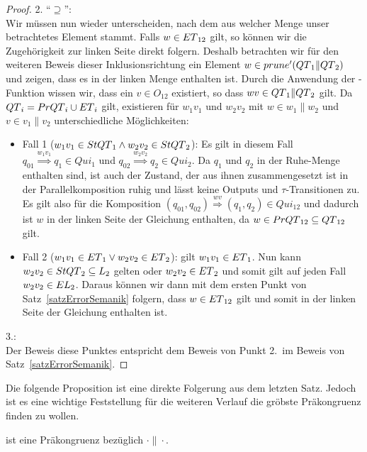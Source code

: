 \begin{proof}
  2. ``$\supseteq$'':\\
  Wir müssen nun wieder unterscheiden, nach dem aus welcher Menge unser
  betrachtetes Element stammt. Falls $w\in ET{}_{12}$ gilt, so können wir die
  Zugehörigkeit zur linken Seite direkt folgern. Deshalb betrachten wir für den
  weiteren Beweis dieser
  Inklusionsrichtung ein Element $w\in prune' (QT{}_1\|QT{}_2)$ und
  zeigen, dass es in der linken Menge enthalten ist. Durch die Anwendung der
  \prunenew{}-Funktion wissen wir, dass ein $v\in O_{12}$ existiert, so dass
  $wv\in QT{}_1\|QT{}_2$ gilt. Da $QT{}_i = PrQT{}_i\cup ET{}_i$ gilt,
  existieren für $w_1v_1$ und $w_2v_2$ mit $w\in w_1\| w_2$ und $v\in v_1\|
  v_2$ unterschiedliche Möglichkeiten:
  \begin{itemize}
    \item Fall 1 ($w_1v_1\in StQT{}_1\wedge w_2v_2\in StQT{}_2$): Es gilt in diesem
      Fall $q_{01} \overset{w_1v_1}{\Rightarrow} q_1\in Qui_1$ und $q_{02}
      \overset{w_2v_2}{\Rightarrow} q_2\in Qui_2$. Da $q_1$ und $q_2$ in der
      Ruhe-Menge enthalten sind, ist auch der Zustand, der aus ihnen
      zusammengesetzt ist in der Parallelkomposition ruhig und lässt keine
      Outputs und $\tau$-Transitionen zu. Es gilt also für die Komposition
      $(q_{01},q_{02}) \overset{wv}{\Rightarrow} (q_1,q_2)\in Qui_{12}$ und
      dadurch ist $w$ in der linken Seite der Gleichung enthalten, da $w\in
      PrQT{}_{12}\subseteq QT{}_{12}$ gilt.
    \item Fall 2 ($w_1v_1\in ET{}_1\vee w_2v_2\in ET{}_2$): \OBdA{} gilt
      $w_1v_1\in ET{}_1$. Nun kann $w_2v_2\in StQT{}_2\subseteq L_2$ gelten
      oder $w_2v_2\in ET{}_2$ und somit gilt auf jeden Fall $w_2v_2\in
      EL{}_2$. Daraus können wir dann mit dem ersten Punkt von
      Satz~\ref{satzErrorSemanik} folgern, dass $w\in ET{}_{12}$ gilt und
      somit in der linken Seite der Gleichung enthalten ist.
  \end{itemize}

  3.:\\
  Der Beweis diese Punktes entspricht dem Beweis von Punkt 2.\ im Beweis von
  Satz~\ref{satzErrorSemanik}.
\end{proof}

Die folgende Proposition ist eine direkte Folgerung aus dem letzten Satz.
Jedoch ist es eine wichtige Feststellung für die weiteren Verlauf die gröbste
Präkongruenz finden zu wollen.

\begin{prop}[Präkongruenz]
  \label{propQuiPrae}
  \QRel{} ist eine Präkongruenz bezüglich $\cdot\|\cdot$.
\end{prop}

